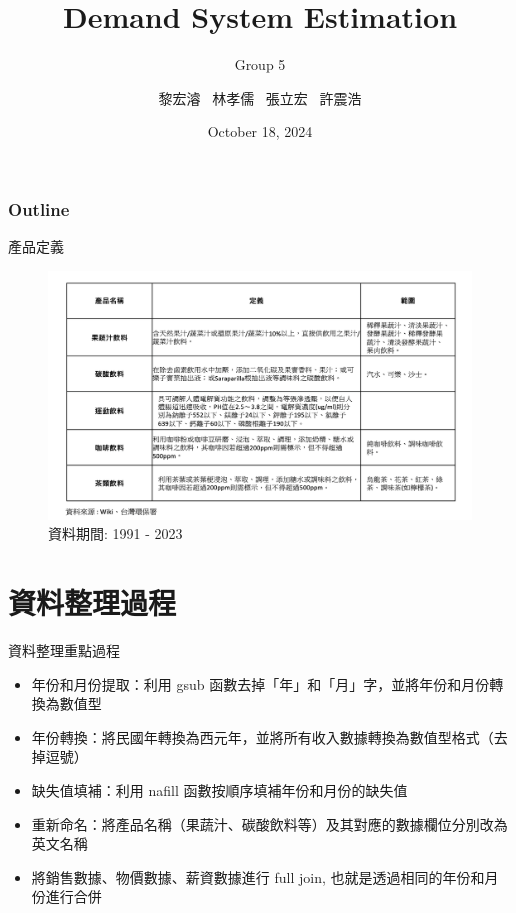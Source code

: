 \documentclass[12pt]{beamer}
\title[]  
{Demand System Estimation}
\subtitle[short subtitle]{Group 5}
\author{黎宏濬 \ 林孝儒 \ 張立宏 \ 許震浩}
\institute[short]{\inst{}Department of Agricultural Economics, NTU}
\date
 {October 18, 2024}
\begin{document}
\begin{frame}{}
    \titlepage
\end{frame}

\begin{frame}
    \frametitle{Outline}
    \tableofcontents[]
\end{frame}

\begin{frame}{產品定義}
	\begin{figure}
		\centering
		\includegraphics[width=1\textwidth]{figures/產品定義.png}
		\caption{資料期間: 1991 - 2023}
	\end{figure}
\end{frame}

\section{資料整理過程}

\begin{frame}{資料整理重點過程}
	\begin{itemize}
		\item 年份和月份提取：利用 gsub 函數去掉「年」和「月」字，並將年份和月份轉換為數值型
		\item 年份轉換：將民國年轉換為西元年，並將所有收入數據轉換為數值型格式（去掉逗號）
		\item 缺失值填補：利用 nafill 函數按順序填補年份和月份的缺失值
		\item 重新命名：將產品名稱（果蔬汁、碳酸飲料等）及其對應的數據欄位分別改為英文名稱  
		\item 將銷售數據、物價數據、薪資數據進行 full join, 也就是透過相同的年份和月份進行合併
	\end{itemize}
\end{frame}
\end{document}
